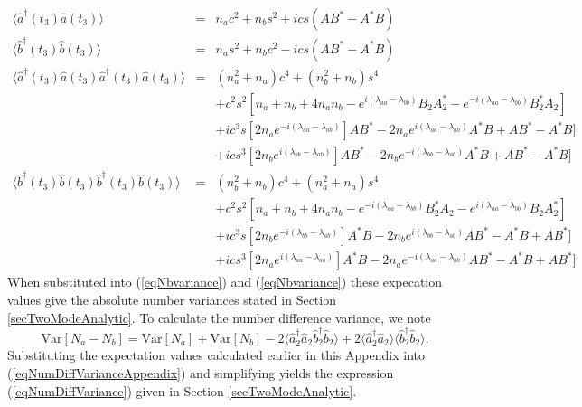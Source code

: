 \documentclass[12pt]{iopart}
\begin{document}
\begin{eqnarray}
\langle \hat{a}^{\dagger}(t_3) \hat{a}(t_3) \rangle &=& n_a c^2 + n_b s^2 + i c s (A B^* - A^* B) \\
%
\langle \hat{b}^{\dagger}(t_3) \hat{b}(t_3) \rangle &=& n_a s^2 + n_b c^2 - i c s (A B^* - A^* B) \\
%
\langle \hat{a}^{\dagger}(t_3) \hat{a}(t_3) \hat{a}^{\dagger}(t_3)  \hat{a}(t_3) \rangle &=& (n_a^2 + n_a) c^4 + (n_b^2 + n_b) s^4 \nonumber \\
&& + c^2 s^2 [n_a +n_b +4 n_a n_b - e^{i(\lambda_{aa}-\lambda_{bb})} B_2 A_2^* - e^{-i(\lambda_{aa}-\lambda_{bb})} B_2^* A_2] \nonumber \\
&& + i c^3 s [2 n_a e^{-i(\lambda_{aa}-\lambda_{ab})}] A B^* - 2 n_a e^{i(\lambda_{aa}-\lambda_{ab})} A^* B + A B^* - A^* B] \nonumber \\
&& + i c s^3 [2 n_b e^{i(\lambda_{bb}-\lambda_{ab})}] A B^* - 2 n_b e^{-i(\lambda_{bb}-\lambda_{ab})} A^* B + A B^* - A^* B] \\
%
\langle \hat{b}^{\dagger}(t_3)  \hat{b}(t_3) \hat{b}^{\dagger}(t_3)  \hat{b}(t_3) \rangle &=& (n_b^2 + n_b) c^4 + (n_a^2 + n_a) s^4 \nonumber \\
&& + c^2 s^2 [n_a +n_b +4 n_a n_b - e^{-i(\lambda_{aa}-\lambda_{bb})} B_2^* A_2 - e^{i(\lambda_{aa}-\lambda_{bb})} B_2 A_2^*] \nonumber \\
&& + i c^3 s [2 n_b e^{-i(\lambda_{bb}-\lambda_{ab})}] A^* B - 2 n_b e^{i(\lambda_{bb}-\lambda_{ab})} A B^* - A^* B + A B^*] \nonumber \\
&& + i c s^3 [2 n_a e^{i(\lambda_{aa}-\lambda_{ab})}] A^* B - 2 n_a e^{-i(\lambda_{aa}-\lambda_{ab})} A B^* - A^* B + A B^*] 
\end{eqnarray}
When substituted into (\ref{eqNbvariance}) and (\ref{eqNbvariance}) these expecation values give the absolute number variances stated in Section \ref{secTwoModeAnalytic}. To calculate the number difference variance, we note
\begin{equation}
{\mathrm{Var}}[N_a-N_b] = {\mathrm{Var}}[N_a] + {\mathrm{Var}}[N_b] - 2\langle \hat{a}^{\dagger}_2 \hat{a}_2 \hat{b}^{\dagger}_2 \hat{b}_2\rangle + 2\langle \hat{a}^{\dagger}_2  \hat{a}_2 \rangle \langle \hat{b}^{\dagger}_2 \hat{b}_2\rangle \label{eqNumDiffVarianceAppendix}.
\end{equation}
Substituting the expectation values calculated earlier in this Appendix into (\ref{eqNumDiffVarianceAppendix}) and simplifying yields the expression (\ref{eqNumDiffVariance}) given in Section \ref{secTwoModeAnalytic}.
\end{document}
